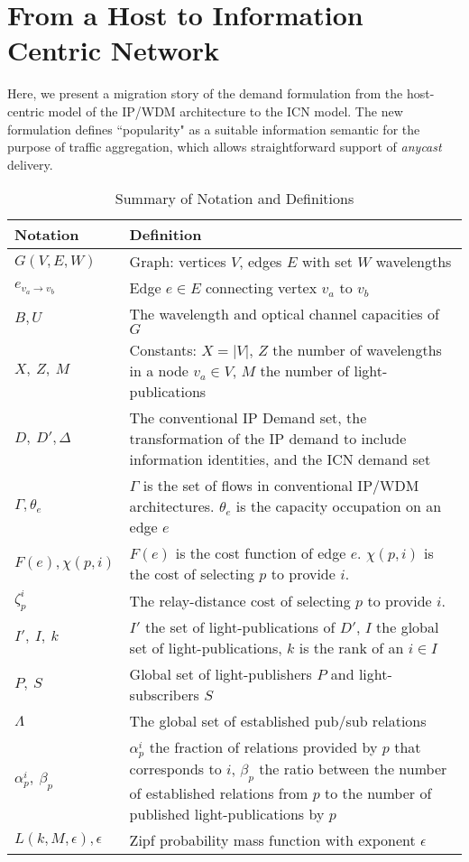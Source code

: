 \documentclass[journal]{IEEEtran}
\begin{document}
\section{From a Host to Information Centric Network}\label{sec:nm}
Here, we present a migration story of the demand formulation from the host-centric model of the IP/WDM architecture to the ICN model. The new formulation defines ``popularity" as a suitable information semantic for the purpose of traffic aggregation, which allows straightforward support of \emph{anycast} delivery.
\begin{table}[tb]
	\centering
	\caption{Summary of Notation and Definitions}
	\label{tab:not}
	\begin{tabular}[\columnwidth]{|p{}|p{}|}
		\hline
		Notation & Definition\\
		\hline 
		$G(V,E,W)$ & Graph: vertices $V$, edges $E$ with set 
                             $W$ wavelengths\\ 
		\hline
		$e_{v_a \rightarrow v_b}$ & Edge $e \in E$ connecting vertex $v_a$ to $v_b$\\	
		\hline
		$B,U$ & The wavelength and optical channel capacities of $G$\\
		\hline
		$X,\ Z, \ M$ & Constants: $X = |V|$, $Z$ the number of
                               wavelengths in a node $v_a \in V$, $M$ the number of light-publications\\
		\hline
		$D, \ D', \Delta$ & The conventional IP Demand set, the transformation of the IP demand to include information identities, and the ICN demand set\\
		\hline
		$\Gamma, \theta_e$ & $\Gamma$ is the set of flows in conventional IP/WDM architectures. $\theta_e$ is the capacity occupation on an edge $e$ \\
		\hline
		$F(e), \chi(p,i)$ & $F(e)$ is the cost function of edge $e$. $\chi(p,i)$ is the cost of selecting $p$ to provide $i$.\\
		\hline
		$ \zeta_p^i$ & The relay-distance cost of selecting $p$ to provide $i$.\\
		\hline
		$I', \ I, \ k$ & $I'$ the set of light-publications of
                                 $D'$, $I$ the global set of light-publications, $k$ is the rank of an $i \in I$\\
		\hline
		$P,\ S$ & Global set of light-publishers $P$ and
                          light-subscribers $S$\\
		\hline
		$\Lambda$ & The global set of established pub/sub relations\\
		\hline
		$\alpha^i_p, \ \beta_p$ & $\alpha^i_p$ the fraction of relations provided by $p$ that corresponds to $i$, $\beta_p$ the ratio between the number of established relations from $p$ to the number of published light-publications by $p$\\
		\hline
		$L(k,M,\epsilon), \epsilon$ & Zipf probability mass
                                              function 
                                              with exponent $\epsilon$\\
		\hline
	\end{tabular}
\end{table}
\end{document}
